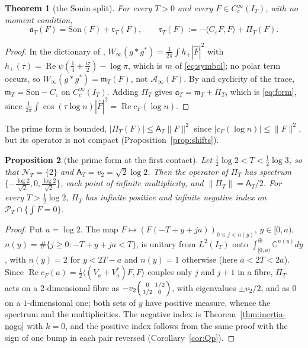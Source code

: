 \documentclass[11pt]{amsart}
\newtheorem{theorem}{Theorem}[section]
\newtheorem{proposition}[theorem]{Proposition}
\theoremstyle{definition}
\theoremstyle{remark}
\newcommand{\C}{\mathbb C}
\newcommand{\Rel}{\operatorname{Re}}
\newcommand{\PT}{\mathcal P_T}
\newcommand{\IT}{I_T}
\newcommand{\Fh}{\widehat F}
\newcommand{\cF}{c_F}
\newcommand{\NT}{\mathcal N_T}
\newcommand{\Aconst}{\mathsf A_T}
\newcommand{\Ainf}{\mathcal A_\infty}
\newcommand{\PiT}{\Pi_T}
\newcommand{\mT}{\mathfrak m_T}
\begin{document}
\begin{theorem}[the Sonin split]\label{thm:inertia-split}
For every $T>0$ and every $F\in C_c^\infty(\IT)$, with no moment condition,
\[
\mathfrak a_T(F)=\mathrm{Son}(F)+\mathfrak r_T(F),\qquad
\mathfrak r_T(F):=-\langle C_\varepsilon F,F\rangle+\PiT(F).
\]
\end{theorem}
\begin{proof}
In the dictionary of \cite[(152)--(154)]{ConnesConsani2021}, $W_\infty(g*g^*)=\frac1{2\pi}\int h_+|\Fh|^2$ with
$h_+(\tau)=\Rel\psi(\frac14+\frac{i\tau}2)-\log\pi$, which is $m$ of \eqref{eq:symbol}; no polar term occurs, so
$W_\infty(g*g^*)=\mT(F)$, not $\Ainf(F)$. By \cite[(83)]{ConnesConsani2021} and cyclicity of the trace,
$\mT=\mathrm{Son}-C_\varepsilon$ on $C_c^\infty(\IT)$. Adding $\PiT$ gives $\mathfrak a_T=\mT+\PiT$, which is \eqref{eq:form},
since $\frac1{2\pi}\int\cos(\tau\log n)|\Fh|^2=\Rel\cF(\log n)$.
\end{proof}

The prime form is bounded, $|\PiT(F)|\le\Aconst\|F\|^2$ since $|\cF(\log n)|\le\|F\|^2$, but its operator is not compact
(Proposition~\ref{prop:shifts}).

\begin{proposition}[the prime form at the first contact]\label{thm:inertia-B2}
Let $\frac12\log2<T<\frac12\log3$, so that $\NT=\{2\}$ and $\Aconst=v_2=\sqrt2\log2$. Then the operator of $\PiT$ has
spectrum $\{-\frac{\log2}{\sqrt2},0,\frac{\log2}{\sqrt2}\}$, each point of infinite multiplicity, and
$\|\PiT\|=\Aconst/2$. For every $T>\frac12\log2$, $\PiT$ has infinite positive and infinite negative index on
$\PT\cap\{\int F=0\}$.
\end{proposition}
\begin{proof}
Put $a=\log2$. The map $F\mapsto(F(-T+y+ja))_{0\le j<n(y)}$, $y\in[0,a)$, $n(y)=\#\{j\ge0:-T+y+ja<T\}$, is unitary from
$L^2(\IT)$ onto $\int^\oplus_{[0,a)}\C^{n(y)}dy$, with $n(y)=2$ for $y<2T-a$ and $n(y)=1$ otherwise (here $a<2T<2a$).
Since $\Rel\cF(a)=\frac12\langle(V_a+V_a^*)F,F\rangle$ couples only $j$ and $j+1$ in a fibre, $\PiT$ acts on a
$2$-dimensional fibre as $-v_2\begin{psmallmatrix}0&1/2\\1/2&0\end{psmallmatrix}$, with eigenvalues $\pm v_2/2$, and as $0$ on a
$1$-dimensional one; both sets of $y$ have positive measure, whence the spectrum and the multiplicities. The
negative index is Theorem~\ref{thm:inertia-nogo} with $k=0$, and the positive index follows from the same proof
with the sign of one bump in each pair reversed (Corollary~\ref{cor:Qp}).
\end{proof}
\end{document}
